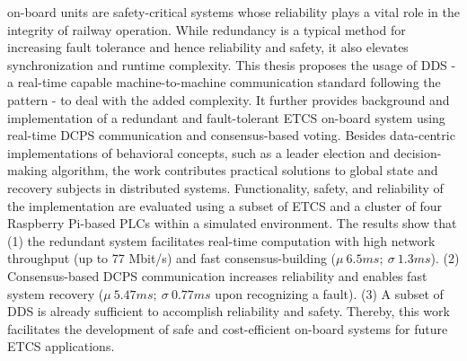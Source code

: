 
\null\vfil
\begin{center}\textsf{\textbf{\abstractname}}\end{center}
%
\noindent {} on-board units are safety-critical systems whose reliability plays a vital role in the integrity of railway operation.
While redundancy is a typical method for increasing fault tolerance and hence reliability and safety, it also elevates synchronization and runtime complexity.
This thesis proposes the usage of DDS - a real-time capable machine-to-machine communication standard following the  pattern - to deal with the added complexity.
It further provides background and implementation of a redundant and fault-tolerant ETCS on-board system using real-time DCPS communication and consensus-based voting.
Besides data-centric implementations of behavioral concepts, such as a leader election and decision-making algorithm, the work contributes practical solutions to global state and recovery subjects in distributed systems.
Functionality, safety, and reliability of the implementation are evaluated using a subset of ETCS and a cluster of four Raspberry Pi-based PLCs within a simulated environment.
The results show that (1) the redundant system facilitates real-time computation with high network throughput (up to 77 Mbit/s) and fast consensus-building ($\mu~6.5ms;~\sigma~1.3ms$). (2) Consensus-based DCPS communication increases reliability and enables fast system recovery ($\mu~5.47ms;~\sigma~0.77ms$ upon recognizing a fault). (3) A subset of DDS is already sufficient to accomplish reliability and safety.
Thereby, this work facilitates the development of safe and cost-efficient on-board systems for future ETCS applications.

\vfil\null
\clearpage

